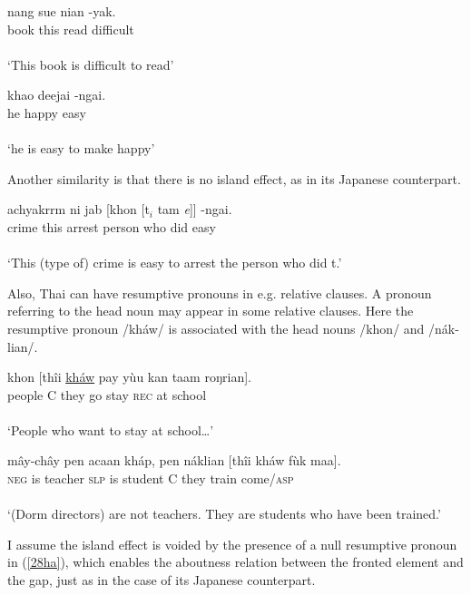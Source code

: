 \documentclass[output=paper,colorlinks,citecolor=brown,
]{langscibook}
\begin{document}
\begin{exe}
\ex \label{26ha}
\gll nang  sue  nian -yak.\\
book this read difficult\\\\
‘This book is difficult to read’

\ex \label{27ha}
\gll khao deejai -ngai.\\
he happy easy\\\\
‘he is easy to make happy’
\end{exe}

Another similarity is that there is no island effect, as in its Japanese counterpart.

\begin{exe}
\ex \label{28ha}
\gll achyakrrm ni  jab [khon  [t$_{i}$   tam  \textit{e}]]  -ngai.\\
crime this arrest person who did {} easy\\\\
‘This (type of) crime is easy to arrest the person who did t.’

\end{exe}

Also, Thai can have resumptive pronouns in e.g. relative clauses. A pronoun referring to the head noun may appear in some relative clauses. Here the resumptive pronoun /kháw/ is associated with the head nouns /khon/ and /nák-lian/.  

\begin{exe}
\ex \label{29ha}
\gll khon  [thîi \underline{kháw} pay yùu  kan taam roŋrian]. \\
people C they go stay \textsc{rec}\footnotemark{} at school\\\\
‘People who want to stay at school…’ \citep{IwasakiIngkaphirom2005}


\ex \label{30ha}
\gll mây-chây pen acaan kháp, pen náklian [thîi kháw fùk maa].\\
\textsc{neg} is teacher \textsc{slp} is student C they train come/\textsc{asp}\\\\
‘(Dorm directors) are not teachers. They are students who have been trained.’
\end{exe}

I assume the island effect is voided by the presence of a null resumptive pronoun in (\ref{28ha}), which enables the aboutness relation between the fronted element and the gap, just as in the case of its Japanese counterpart. 
\end{document}
